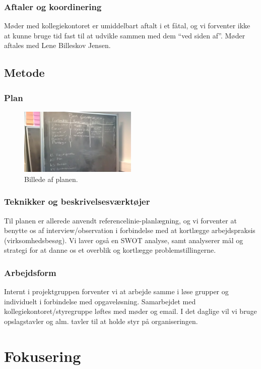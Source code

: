 \documentclass[12pt, a4paper]{report}
\begin{document}
\subsubsection{Aftaler og koordinering}
Møder med kollegiekontoret er umiddelbart aftalt i et fåtal, og vi forventer ikke at kunne bruge tid fast til at udvikle sammen med dem “ved siden af”. Møder aftales med Lene Billeskov Jensen.

\subsection{Metode}

\subsubsection{Plan}
\begin{figure}[h!]
\includegraphics[width=0.5\textwidth]{forundersoegelsesplan.jpg}
\caption{Billede af planen.}
\end{figure}

\subsubsection{Teknikker og beskrivelsesværktøjer}
Til planen er allerede anvendt referencelinie-planlægning, og vi forventer at benytte os af interview/observation i forbindelse med at kortlægge arbejdspraksis (virksomhedsbesøg). Vi laver også en SWOT analyse, samt analyserer mål og strategi for at danne os et overblik og kortlægge problemstillingerne.

\subsubsection{Arbejdsform}
Internt i projektgruppen forventer vi at arbejde samme i løse grupper og individuelt i forbindelse med opgaveløsning. Samarbejdet med kollegiekontoret/styregruppe løftes med møder og email.
I det daglige vil vi bruge opslagstavler og alm. tavler til at holde styr på organiseringen.

\section{Fokusering}
\end{document}
